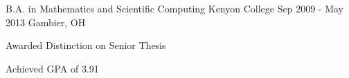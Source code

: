
\begin{cventries}

  \cventry
    {B.A. in Mathematics and Scientific Computing}
    {Kenyon College}
    {Sep 2009 - May 2013}
    {Gambier, OH}
    {
      \begin{cvitems}
        \item {Awarded Distinction on Senior Thesis}
        \item {Achieved GPA of 3.91}
      \end{cvitems}
    }

\end{cventries}
